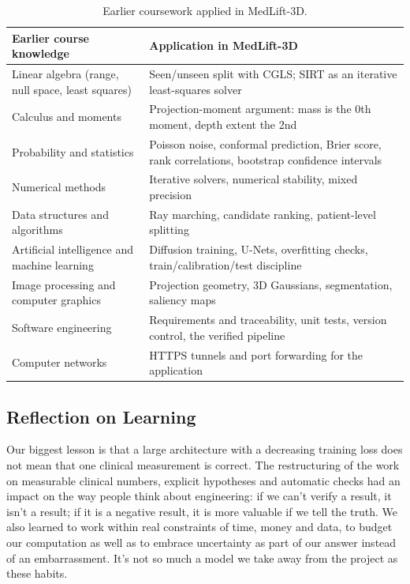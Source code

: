 \begin{table}[!htbp]
\centering\small
\caption{Earlier coursework applied in MedLift-3D.}
\label{tab:transfer}
\begin{tabularx}{\linewidth}{>{\raggedright\arraybackslash}p{4.8cm} >{\raggedright\arraybackslash}X}
\toprule
Earlier course knowledge & Application in MedLift-3D \\
\midrule
Linear algebra (range, null space, least squares) & Seen/unseen split with CGLS; SIRT as an iterative least-squares solver \\
Calculus and moments & Projection-moment argument: mass is the 0th moment, depth extent the 2nd \\
Probability and statistics & Poisson noise, conformal prediction, Brier score, rank correlations, bootstrap confidence intervals \\
Numerical methods & Iterative solvers, numerical stability, mixed precision \\
Data structures and algorithms & Ray marching, candidate ranking, patient-level splitting \\
Artificial intelligence and machine learning & Diffusion training, U-Nets, overfitting checks, train/calibration/test discipline \\
Image processing and computer graphics & Projection geometry, 3D Gaussians, segmentation, saliency maps \\
Software engineering & Requirements and traceability, unit tests, version control, the verified pipeline \\
Computer networks & HTTPS tunnels and port forwarding for the application \\
\bottomrule
\end{tabularx}
\end{table}

\subsection{Reflection on Learning}
Our biggest lesson is that a large architecture with a decreasing training loss does not mean that one clinical measurement is correct. The restructuring of the work on measurable clinical numbers, explicit hypotheses and automatic checks had an impact on the way people think about engineering: if we can't verify a result, it isn't a result; if it is a negative result, it is more valuable if we tell the truth. We also learned to work within real constraints of time, money and data, to budget our computation as well as to embrace uncertainty as part of our answer instead of an embarrassment. It's not so much a model we take away from the project as these habits.
